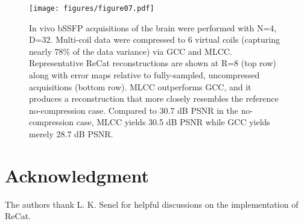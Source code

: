 \documentclass[11pt, onecolumn]{article}
\newcommand{\ohwidth}{0.75\columnwidth}
\begin{document}
\begin{figure}[t]
  \begin{center}
    \texttt{[image: figures/figure07.pdf]}
    \caption{In vivo bSSFP acquisitions of the brain were performed with N=4, D=32. Multi-coil data were compressed to 6 virtual coils (capturing nearly 78\% of the data variance) via GCC and MLCC. Representative ReCat reconstructions are shown at R=8 (top row) along with error maps relative to fully-sampled, uncompressed acquisitions (bottom row). MLCC outperforms GCC, and it produces a reconstruction that more closely resembles the reference no-compression case. Compared to 30.7 dB PSNR in the no-compression case, MLCC yields 30.5 dB PSNR while GCC yields merely 28.7 dB PSNR.
    }
    \label{fig:coil_compression}
  \end{center}
\end{figure}






\section*{Acknowledgment}
The authors thank L. K. Senel for helpful discussions on the implementation of ReCat.



\clearpage


\clearpage
\listoftables
\clearpage
\listoffigures
\clearpage
\end{document}
